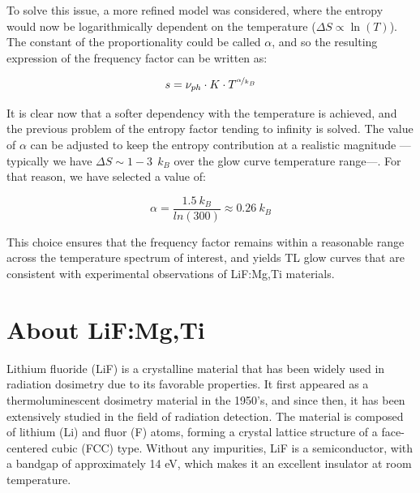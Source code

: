 \vspace{10pt}

To solve this issue, a more refined model was considered, where the entropy would now be logarithmically dependent on the temperature ($\Delta S \propto \ln(T)$). The constant of the proportionality could be called $\alpha$, and so the resulting expression of the frequency factor can be written as:

\begin{equation}\label{eq:freqfactor_lnT}
    s = \nu_{ph} \cdot K \cdot T^{\nicefrac{\alpha}{k_B}}
\end{equation}

\vspace{10pt}

It is clear now that a softer dependency with the temperature is achieved, and the previous problem of the entropy factor tending to infinity is solved. The value of $\alpha$ can be adjusted to keep the entropy contribution at a realistic magnitude ---typically we have $\Delta S \sim  1\!-\!3 ~~k_B$ over the glow curve temperature range---. For that reason, we have selected a value of:

\begin{equation}
    \alpha = \frac{1.5 ~k_B}{ln(300)} \approx 0.26 ~k_B
\end{equation}

\vspace{10pt}

This choice ensures that the frequency factor remains within a reasonable range across the temperature spectrum of interest, and yields TL glow curves that are consistent with experimental observations of LiF:Mg,Ti materials.


\section{About LiF:Mg,Ti} \label{sec:LiF}


Lithium fluoride (LiF) is a crystalline material that has been widely used in radiation dosimetry due to its favorable %
properties. It first appeared as a thermoluminescent dosimetry material in the 1950's, and since then, it has been extensively studied in the field of radiation detection. The material is composed of lithium (Li) and fluor (F) %
atoms, forming a crystal lattice structure of a face-centered cubic (FCC) type. Without any impurities, LiF is a semiconductor, with a bandgap of approximately 14 eV, which makes it an excellent insulator at room temperature.

